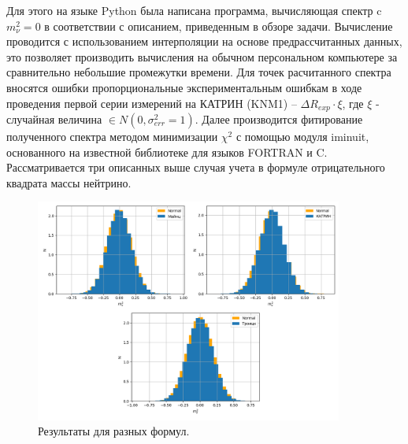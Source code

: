 ﻿\documentclass[a4paper,14pt]{extarticle}
\begin{document}
    Для этого на языке Python была написана программа, вычисляющая спектр c $m^2_\nu=0$ 
    в соответствии с описанием, приведенным в обзоре задачи. Вычисление проводится с 
    использованием интерполяции на основе предрассчитанных данных, это позволяет
    производить вычисления на обычном персональном компьютере за сравнительно 
    небольшие промежутки времени. Для точек расчитанного
    спектра вносятся ошибки пропорциональные экспериментальным ошибкам в ходе проведения 
    первой серии измерений на КАТРИН (KNM1) -- $\Delta R_{exp} \cdot \xi$, где $\xi$ -
    случайная величина $\in N(0, \sigma^2_{err} = 1)$. Далее производится фитирование полученного
    спектра методом минимизации $\chi^2$ с помощью модуля iminuit, основанного на известной
    библиотеке для языков FORTRAN и C. Рассматривается три описанных выше случая учета
    в формуле отрицательного квадрата массы нейтрино.
    
    
    \begin{figure}
        \center
        \includegraphics[width=0.9\textwidth]{hists}
        \captionsetup{width=0.8\textwidth}
        \caption{Результаты для разных формул.}
        \label{fig:hists}
    \end{figure}
    
\end{document}
